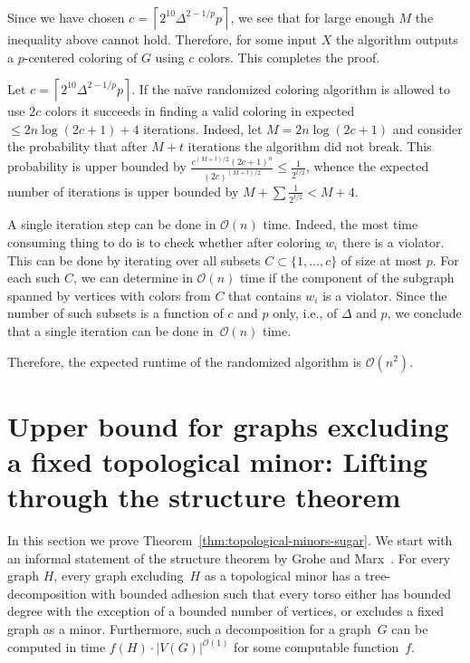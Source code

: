 Since we have chosen $c=\left\lceil2^{10}\Delta^{2-1/p}p\right\rceil$, 
we see that for large enough
$M$ the inequality above cannot hold.
Therefore, for some input $X$ the algorithm outputs a
$p$-centered coloring of $G$ using $c$ colors.
This completes the proof. 

\medskip

Let $c=\left\lceil2^{10}\Delta^{2-1/p}p\right\rceil$. 
If the naïve randomized coloring algorithm
is allowed to use $2c$ colors it succeeds in finding a valid coloring
in expected $\leq 2n\log(2c+1) + 4$ iterations.
Indeed, let $M=2n\log(2c+1)$ and consider the probability that
after $M+t$ iterations the algorithm did not break. This probability
is upper bounded by
$\frac{c^{(M+t)/2}(2c+1)^{n}}{(2c)^{(M+t)/2}}\leq\frac{1}{2^{t/2}}$,
whence the expected number of iterations is upper bounded by
$M + \sum \frac{1}{2^{t/2}} < M+4$. 

A single iteration step can be done in $\mathcal{O}(n)$ time.  Indeed, the most time
consuming thing to do is to check whether after coloring $w_i$
there is a violator. This can be done by iterating over all subsets
$C\subset\{1,\ldots,c\}$ of size at most $p$.  For each such $C$, we can
determine in $\mathcal{O}(n)$ time if the component of the subgraph spanned by
vertices with colors from $C$ that contains $w_i$ is a violator.  Since the
number of such subsets is a function of $c$ and $p$ only, i.e., of $\Delta$
and $p$, we conclude that a single iteration can be done in~$\mathcal{O}(n)$ time.

Therefore, the expected runtime of the randomized algorithm is $\mathcal{O}(n^2)$.


\section{Upper bound for graphs excluding a fixed topological minor: 
Lifting through the structure theorem}
\label{sec-lifting}


In this section we prove Theorem~\ref{thm:topological-minors-sugar}.
We start with an informal statement of the structure theorem by Grohe
and Marx~\cite{GM15}.  For every graph $H$, every graph excluding~$H$
as a topological minor has a tree-decomposition with bounded adhesion
such that every torso either has bounded degree with the exception
of a bounded number of vertices, or excludes a fixed graph as a
minor.  Furthermore, such a decomposition for a graph~$G$ can be
computed in time $f(H)\cdot|V(G)|^{\mathcal{O}(1)}$ for some computable
function~$f$.

